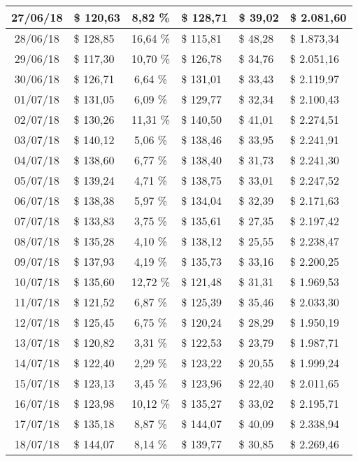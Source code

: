 \begin{center}
\begin{small}
\begin{longtable}{|c|l|c|l|l|l|}
27/06/18 & \$ 120,63 & 8,82 \% & \$ 128,71 & \$ 39,02 & \$ 2.081,60 \\ \hline
28/06/18 & \$ 128,85 & 16,64 \% & \$ 115,81 & \$ 48,28 & \$ 1.873,34 \\ \hline
29/06/18 & \$ 117,30 & 10,70 \% & \$ 126,78 & \$ 34,76 & \$ 2.051,16 \\ \hline
30/06/18 & \$ 126,71 & 6,64 \% & \$ 131,01 & \$ 33,43 & \$ 2.119,97 \\ \hline
01/07/18 & \$ 131,05 & 6,09 \% & \$ 129,77 & \$ 32,34 & \$ 2.100,43 \\ \hline
02/07/18 & \$ 130,26 & 11,31 \% & \$ 140,50 & \$ 41,01 & \$ 2.274,51 \\ \hline
03/07/18 & \$ 140,12 & 5,06 \% & \$ 138,46 & \$ 33,95 & \$ 2.241,91 \\ \hline
04/07/18 & \$ 138,60 & 6,77 \% & \$ 138,40 & \$ 31,73 & \$ 2.241,30 \\ \hline
05/07/18 & \$ 139,24 & 4,71 \% & \$ 138,75 & \$ 33,01 & \$ 2.247,52 \\ \hline
06/07/18 & \$ 138,38 & 5,97 \% & \$ 134,04 & \$ 32,39 & \$ 2.171,63 \\ \hline
07/07/18 & \$ 133,83 & 3,75 \% & \$ 135,61 & \$ 27,35 & \$ 2.197,42 \\ \hline
08/07/18 & \$ 135,28 & 4,10 \% & \$ 138,12 & \$ 25,55 & \$ 2.238,47 \\ \hline
09/07/18 & \$ 137,93 & 4,19 \% & \$ 135,73 & \$ 33,16 & \$ 2.200,25 \\ \hline
10/07/18 & \$ 135,60 & 12,72 \% & \$ 121,48 & \$ 31,31 & \$ 1.969,53 \\ \hline
11/07/18 & \$ 121,52 & 6,87 \% & \$ 125,39 & \$ 35,46 & \$ 2.033,30 \\ \hline
12/07/18 & \$ 125,45 & 6,75 \% & \$ 120,24 & \$ 28,29 & \$ 1.950,19 \\ \hline
13/07/18 & \$ 120,82 & 3,31 \% & \$ 122,53 & \$ 23,79 & \$ 1.987,71 \\ \hline
14/07/18 & \$ 122,40 & 2,29 \% & \$ 123,22 & \$ 20,55 & \$ 1.999,24 \\ \hline
15/07/18 & \$ 123,13 & 3,45 \% & \$ 123,96 & \$ 22,40 & \$ 2.011,65 \\ \hline
16/07/18 & \$ 123,98 & 10,12 \% & \$ 135,27 & \$ 33,02 & \$ 2.195,71 \\ \hline
17/07/18 & \$ 135,18 & 8,87 \% & \$ 144,07 & \$ 40,09 & \$ 2.338,94 \\ \hline
18/07/18 & \$ 144,07 & 8,14 \% & \$ 139,77 & \$ 30,85 & \$ 2.269,46 \\ \hline

\end{longtable}
\end{small}
\end{center}
